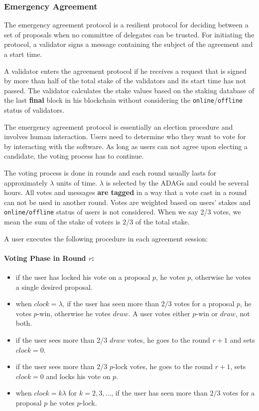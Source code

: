 \subsubsection{Emergency Agreement}

The emergency agreement protocol is a resilient protocol for deciding between a set of proposals when no committee of
delegates can be trusted. For initiating the protocol, a validator signs a message containing the subject
of the agreement and a start time.

A validator enters the agreement protocol if he
receives a request that is signed by more than half of the total stake
of the validators and its start time has not passed. The validator calculates
the stake values based on the staking database of the last \textbf{final} block in his blockchain without
considering the \texttt{online}/\texttt{offline} status of validators.

The emergency agreement protocol is essentially an election procedure and involves human interaction. Users need to
determine who they want to vote for by interacting with the software. As long as users can not agree upon electing a
candidate, the voting process has to continue.

The voting process is done in rounds and each round usually lasts for approximately $\lambda$ units of time.
$\lambda$ is selected by the ADAGs and could be several hours. All votes and messages \textbf{are tagged} in a way
that a vote cast in a round can not be used in another round. Votes are weighted based on users' stakes and
\texttt{online/offline} status of users is not considered. When we say 2/3 votes, we mean the sum of the stake of
voters is 2/3 of the total stake.

A user executes the following procedure in each agreement session:
\paragraph{Voting Phase in Round $r$:}
\begin{itemize}
    \item if the user has locked his vote on a proposal $p$, he votes $p$, otherwise he votes a single desired
    proposal.
    \item when $clock = \lambda$, if the user has seen more than $2/3$ votes for a proposal $p$, he votes $p$-win,
    otherwise he votes $draw$. A user votes either $p$-win or $draw$, not both.
    \item if the user sees more than 2/3 $draw$ votes, he goes to the round $r+1$ and sets $clock=0$.
    \item if the user sees more than 2/3 $p$-lock votes, he goes to the round $r+1$, sets $clock=0$ and locks his
    vote on $p$.
    \item when $clock = k \lambda$ for $k=2,3,\dots$, if the user has seen more than $2/3$ votes for a proposal
    $p$ he votes $p$-lock.
\end{itemize}

